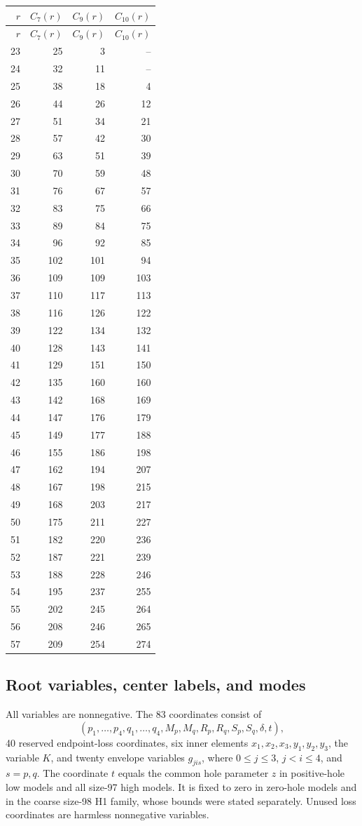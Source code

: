 \documentclass[11pt,a4paper]{article}
\theoremstyle{remark}
\begin{document}
\begin{longtable}{rrrr}
\toprule
$r$&$C_7(r)$&$C_9(r)$&$C_{10}(r)$\\\midrule
\endfirsthead
\toprule
$r$&$C_7(r)$&$C_9(r)$&$C_{10}(r)$\\\midrule
\endhead
23&25&3&--\\
24&32&11&--\\
25&38&18&4\\
26&44&26&12\\
27&51&34&21\\
28&57&42&30\\
29&63&51&39\\
30&70&59&48\\
31&76&67&57\\
32&83&75&66\\
33&89&84&75\\
34&96&92&85\\
35&102&101&94\\
36&109&109&103\\
37&110&117&113\\
38&116&126&122\\
39&122&134&132\\
40&128&143&141\\
41&129&151&150\\
42&135&160&160\\
43&142&168&169\\
44&147&176&179\\
45&149&177&188\\
46&155&186&198\\
47&162&194&207\\
48&167&198&215\\
49&168&203&217\\
50&175&211&227\\
51&182&220&236\\
52&187&221&239\\
53&188&228&246\\
54&195&237&255\\
55&202&245&264\\
56&208&246&265\\
57&209&254&274\\
\bottomrule
\end{longtable}

\subsection{Root variables, center labels, and modes}
All variables are nonnegative. The 83 coordinates consist of
\[
 (p_1,\ldots,p_4,q_1,\ldots,q_4,M_p,M_q,R_p,R_q,S_p,S_q,\delta,t),
\]
40 reserved endpoint-loss coordinates, six inner elements
$x_1,x_2,x_3,y_1,y_2,y_3$, the variable $K$, and twenty envelope variables
$g_{jis}$, where $0\leq j\leq3$, $j<i\leq4$, and $s=p,q$.
The coordinate $t$ equals the common hole parameter $z$ in positive-hole
low models and all size-97 high models. It is fixed to zero in zero-hole
models and in the coarse size-98 H1 family, whose bounds were stated
separately. Unused loss coordinates are harmless nonnegative variables.
\end{document}
